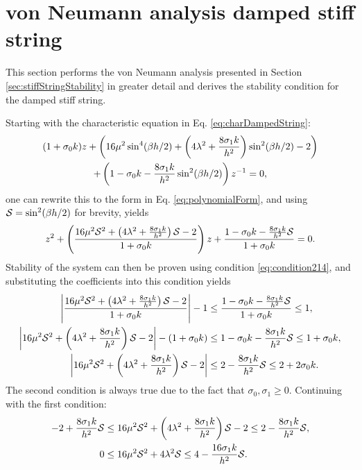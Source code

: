 \section{von Neumann analysis damped stiff string}\label{app:vonNeumannString}
This section performs the von Neumann analysis presented in Section \ref{sec:stiffStringStability} in greater detail and derives the stability condition for the damped stiff string.

Starting with the characteristic equation in Eq. \eqref{eq:charDampedString}:
\begin{gather*}
    (1+\sz k)z + \left(16\mu^2\sin^4(\beta h/2)+\left(4\lambda^2+\frac{8\so k}{h^2}\right)\sin^2(\beta h/2) - 2\right)\nonumber\\
    +\left(1-\sz k-\frac{8\so k}{h^2}\sin^2(\beta h/2)\right)z^{-1}=0,
\end{gather*}
one can rewrite this to the form in Eq. \eqref{eq:polynomialForm}, and using $\S = \sin^2(\beta h /2)$ for brevity, yields
\begin{equation*}
    z^2 + \left(\frac{16\mu^2\S^2+\left(4\lambda^2+\frac{8\so k}{h^2}\right)\S - 2}{1 + \sz k}\right)z+\frac{1-\sz k-\frac{8\so k}{h^2}\S}{1 + \sz k}=0.
\end{equation*}
Stability of the system can then be proven using condition \eqref{eq:condition214}, and substituting the coefficients into this condition yields
\begin{equation}\nonumber
    \begin{aligned}
        \left|\frac{16\mu^2\S^2+\left(4\lambda^2+\frac{8\so k}{h^2}\right)\S - 2}{1+\sz k}\right|-1 &\leq \frac{1-\sz k-\frac{8\so k}{h^2}\S}{1+\sz k}\leq 1,\\
        \left|16\mu^2\S^2+\left(4\lambda^2+\frac{8\so k}{h^2}\right)\S - 2\right|-(1+\sz k) &\leq 1-\sz k-\frac{8\so k}{h^2}\S\leq 1+\sz k,\\
        \left|16\mu^2\S^2+\left(4\lambda^2+\frac{8\so k}{h^2}\right)\S - 2\right|&\leq2-\frac{8\so k}{h^2}\S\leq2+2\sz k.
    \end{aligned}
\end{equation}
The second condition is always true due to the fact that $\sigma_0,\sigma_1 \geq 0$. Continuing with the first condition: 
\begin{align*}
    -2+\frac{8\so k}{h^2}\S&\leq 16\mu^2\S^2+\left(4\lambda^2+\frac{8\so k}{h^2}\right)\S - 2\leq 2-\frac{8\so k}{h^2}\S,\\
    0&\leq 16\mu^2\S^2+4\lambda^2\S\leq 4-\frac{16\so k}{h^2}\S.
\end{align*}
